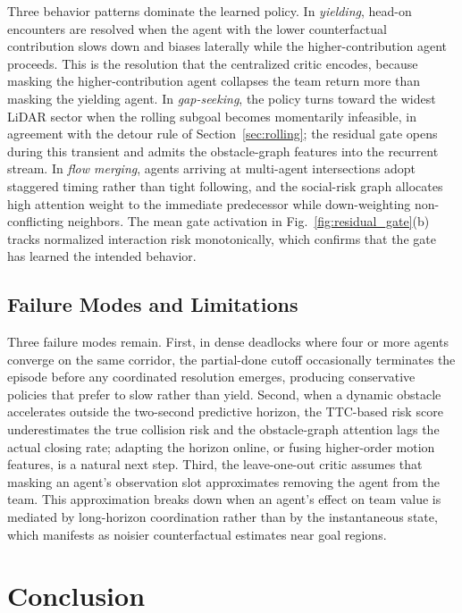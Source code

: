 \documentclass[journal,twoside,web]{ieeecolor}
\begin{document}
Three behavior patterns dominate the learned policy. In \emph{yielding}, head-on encounters are resolved when the agent with the lower counterfactual contribution slows down and biases laterally while the higher-contribution agent proceeds. This is the resolution that the centralized critic encodes, because masking the higher-contribution agent collapses the team return more than masking the yielding agent. In \emph{gap-seeking}, the policy turns toward the widest LiDAR sector when the rolling subgoal becomes momentarily infeasible, in agreement with the detour rule of Section~\ref{sec:rolling}; the residual gate opens during this transient and admits the obstacle-graph features into the recurrent stream. In \emph{flow merging}, agents arriving at multi-agent intersections adopt staggered timing rather than tight following, and the social-risk graph allocates high attention weight to the immediate predecessor while down-weighting non-conflicting neighbors. The mean gate activation in Fig.~\ref{fig:residual_gate}(b) tracks normalized interaction risk monotonically, which confirms that the gate has learned the intended behavior.

\subsection{Failure Modes and Limitations}

Three failure modes remain. First, in dense deadlocks where four or more agents converge on the same corridor, the partial-done cutoff occasionally terminates the episode before any coordinated resolution emerges, producing conservative policies that prefer to slow rather than yield. Second, when a dynamic obstacle accelerates outside the two-second predictive horizon, the TTC-based risk score underestimates the true collision risk and the obstacle-graph attention lags the actual closing rate; adapting the horizon online, or fusing higher-order motion features, is a natural next step. Third, the leave-one-out critic assumes that masking an agent's observation slot approximates removing the agent from the team. This approximation breaks down when an agent's effect on team value is mediated by long-horizon coordination rather than by the instantaneous state, which manifests as noisier counterfactual estimates near goal regions.

\section{Conclusion}
\label{sec:conclusion}
\end{document}
